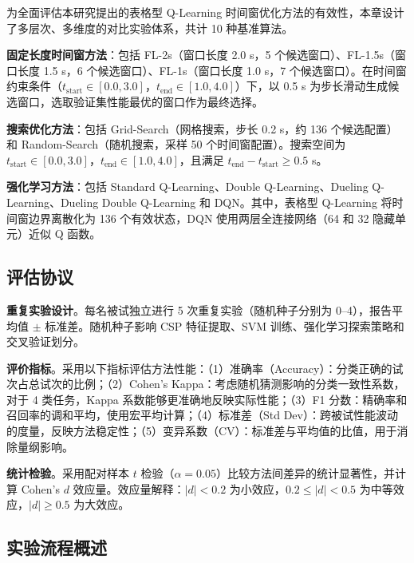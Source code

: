 为全面评估本研究提出的表格型 Q-Learning 时间窗优化方法的有效性，本章设计了多层次、多维度的对比实验体系，共计 10 种基准算法。

\textbf{固定长度时间窗方法}：包括 FL-2s（窗口长度 2.0 s，5 个候选窗口）、FL-1.5s（窗口长度 1.5 s，6 个候选窗口）、FL-1s（窗口长度 1.0 s，7 个候选窗口）。在时间窗约束条件（$t_{\text{start}} \in [0.0, 3.0]$，$t_{\text{end}} \in [1.0, 4.0]$）下，以 0.5 s 为步长滑动生成候选窗口，选取验证集性能最优的窗口作为最终选择。

\textbf{搜索优化方法}：包括 Grid-Search（网格搜索，步长 0.2 s，约 136 个候选配置）和 Random-Search（随机搜索，采样 50 个时间窗配置）。搜索空间为 $t_{\text{start}} \in [0.0, 3.0]$，$t_{\text{end}} \in [1.0, 4.0]$，且满足 $t_{\text{end}} - t_{\text{start}} \geq 0.5$ s。

\textbf{强化学习方法}：包括 Standard Q-Learning\cite{watkins1992q}、Double Q-Learning\cite{van2016deep, hasselt2010double}、Dueling Q-Learning\cite{wang2016dueling}、Dueling Double Q-Learning 和 DQN\cite{mnih2015human}。其中，表格型 Q-Learning 将时间窗边界离散化为 136 个有效状态，DQN 使用两层全连接网络（64 和 32 隐藏单元）近似 Q 函数。

\subsection{评估协议}
\label{subsec:evaluation_protocol}

\textbf{重复实验设计}。每名被试独立进行 5 次重复实验（随机种子分别为 0--4），报告平均值 $\pm$ 标准差。随机种子影响 CSP 特征提取、SVM 训练、强化学习探索策略和交叉验证划分。

\textbf{评价指标}。采用以下指标评估方法性能\cite{tangermann2012review, cohen1960coefficient}：（1）准确率（Accuracy）：分类正确的试次占总试次的比例；（2）Cohen's Kappa：考虑随机猜测影响的分类一致性系数，对于 4 类任务，Kappa 系数能够更准确地反映实际性能；（3）F1 分数：精确率和召回率的调和平均，使用宏平均计算；（4）标准差（Std Dev）：跨被试性能波动的度量，反映方法稳定性；（5）变异系数（CV）：标准差与平均值的比值，用于消除量纲影响。

\textbf{统计检验}。采用配对样本 $t$ 检验（$\alpha = 0.05$）比较方法间差异的统计显著性，并计算 Cohen's $d$ 效应量\cite{field2013discovering, cohen1988statistical}。效应量解释：$|d| < 0.2$ 为小效应，$0.2 \leq |d| < 0.5$ 为中等效应，$|d| \geq 0.5$ 为大效应。

\subsection{实验流程概述}
\label{subsec:experimental_procedure}

